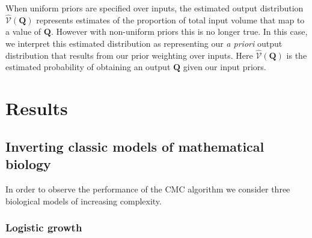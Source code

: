 \documentclass[10pt,letterpaper]{article}
\begin{document}
\vspace{0.5cm}

When uniform priors are specified over inputs, the estimated output distribution $\widehat{\mathcal{V}}(\boldsymbol{Q})$ represents estimates of the proportion of total input volume that map to a value of $\boldsymbol{Q}$. However with non-uniform priors this is no longer true. In this case, we interpret this estimated distribution as representing our \textit{a priori} output distribution that results from our prior weighting over inputs. Here $\widehat{\mathcal{V}}(\boldsymbol{Q})$ is the estimated probability of obtaining an output $\boldsymbol{Q}$ given our input priors.





\section{Results}
\subsection{Inverting classic models of mathematical biology}
\label{sec:results}

In order to observe the performance of the CMC algorithm we consider three biological models of increasing complexity.


\subsubsection{Logistic growth}
\label{sec:logistic}
\end{document}
